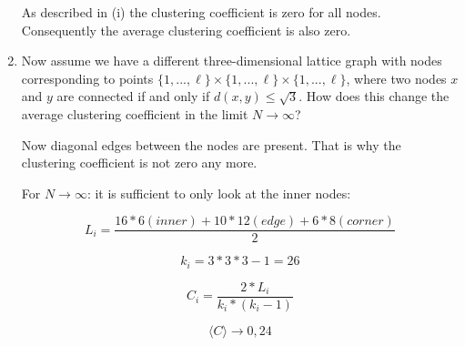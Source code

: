 \begin{enumerate}
	As described in (i) the clustering coefficient is zero for all nodes. Con\-se\-quent\-ly the average clustering coefficient is also zero.
	
	\item Now assume we have a different three-dimensional lattice graph with nodes corresponding to points $\{1,...,\ell\}\times\{1,...,\ell\}\times\{1,...,\ell\}$, where two nodes $x$ and $y$ are connected if and only if $d(x,y) \leq \sqrt{3}$. How	does this change the average clustering coefficient in the limit $N \rightarrow \infty$?
	\vspace{0.25cm}
	
	Now diagonal edges between the nodes are present. That is why the clustering coefficient is not zero any more.
	
	For $N \rightarrow \infty$: it is sufficient to only look at the inner nodes: 
	
	\begin{equation}
	L_i = \frac{16*6 (inner) + 10*12 (edge) + 6*8 (corner)}{2}
	\end{equation}
	
	\begin{equation}
	k_i = 3*3*3-1 = 26
	\end{equation}
	
	\begin{equation}
	C_i = \frac{2*L_i}{k_i * (k_i-1)}
	\end{equation}
	
	\begin{equation}
	\langle C \rangle \rightarrow 0,24
	\end{equation}
	
\end{enumerate}